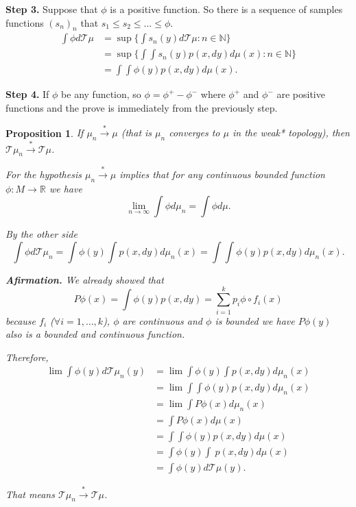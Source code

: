 \documentclass[a4paper]{article}
\theoremstyle{plain}
\newtheorem{prop} [theorem]{Proposition}
\theoremstyle{definition}
\begin{document}
    \textbf{Step 3.} Suppose that $\phi$ is a positive function. So there is a sequence of samples functions $(s_n)_n$ that $s_1 \leq s_2 \leq \dots \leq \phi$. 
    \begin{align*}
    \int \phi d\mathcal{T}\mu &=  \sup \Big\{ \int s_n(y) d\mathcal{T}\mu: n \in \mathbb{N}\Big\}\\
    &=\sup \Big\{ \int \int s_n(y) p(x,dy) d\mu(x): n \in \mathbb{N}\Big\}\\
    &=\int \int \phi(y) p(x,dy) d\mu(x).
    \end{align*}

    \textbf{Step 4.} If $\phi$ be any function, so $\phi = \phi^+ - \phi^-$ where $\phi^+$ and $\phi^-$ are positive functions and the prove is immediately from the previously step.
    
    \begin{prop}\label{Convergence fixed point}
        If $\mu_n \overset{*}{\to} \mu$ (that is $\mu_n$ converges to $\mu$ in the weak* topology), then  
        $\mathcal{T}\mu_n \overset{*}{\to} \mathcal{T}\mu$.

        \proof For the hypothesis $\mu_n \overset{*}{\to} \mu$ implies that for any continuous bounded function $\phi:M \to \mathbb{R}$ we have
        $$ \lim_{n \to \infty} \int \phi d\mu_n = \int \phi d\mu.$$

        By the other side 
        $$\int \phi d\mathcal{T}\mu_n = \int \phi(y) \int p(x,dy) d\mu_n(x) = \int \int \phi(y) p(x,dy) d \mu_n(x).$$

        \textbf{Afirmation. }
        We already showed that 
        $$ P\phi(x) = \int \phi(y) p(x,dy) = \sum_{i=1}^{k} p_i \phi \circ f_i(x)$$
    because $f_i$ ($\forall i=1,\dots,k$), $\phi$ are continuous and $\phi$ is bounded we have $P\phi(y)$ also is a bounded and continuous function. 

        Therefore, 
        \begin{align*}
         \lim \int \phi(y) d\mathcal{T}\mu_n(y) 
         &= \lim \int \phi(y) \int  p(x,dy) d \mu_n(x) \\
         &= \lim \int \int \phi(y) p(x,dy) d \mu_n(x) \\
         &= \lim \int P\phi(x) d \mu_n(x) \\
         &= \int P\phi(x) d \mu(x) \\
         &= \int \int \phi(y) p(x,dy) d \mu(x)\\
         &= \int \phi(y) \int \ p(x,dy) d \mu(x)\\
         &=\int \phi(y) d\mathcal{T}\mu(y).
        \end{align*}

        That means $\mathcal{T}\mu_n \overset{*}{\to} \mathcal{T}\mu$.
    \end{prop}
\end{document}
